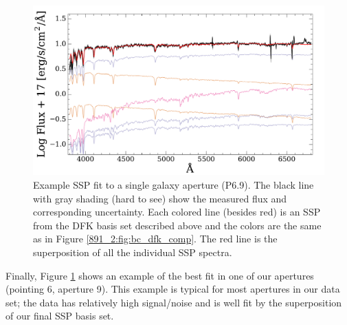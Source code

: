 \begin{figure}
  \centering
  \includegraphics[width=\columnwidth]{891_2/figs/example_fit.pdf}
  \caption[Example model galaxy
    fit]{\fixspacing\label{891_2:fig:ex_fit}Example SSP fit to a
    single galaxy aperture (P6.9). The black line with gray shading
    (hard to see) show the measured flux and corresponding
    uncertainty. Each colored line (besides red) is an SSP from the
     DFK basis set described above and the
    colors are the same as in Figure \ref{891_2:fig:bc_dfk_comp}. The
    red line is the superposition of all the individual SSP spectra.}
\end{figure}

Finally, Figure \ref{891_2:fig:ex_fit} shows an example of the best
fit in one of our apertures (pointing 6, aperture 9). This example is
typical for most apertures in our data set; the data has relatively
high signal/noise and is well fit by the superposition of our final
SSP basis set.

